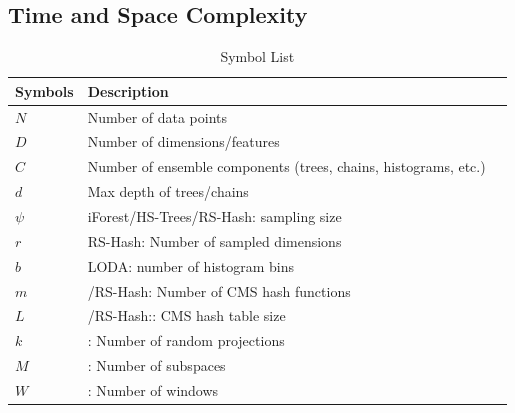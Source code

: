 \subsection{Time and Space Complexity}
%
%

\begin{table}[ht!]
	\caption{Symbol List}
	\centering
	\begin{tabular}{lll}
		\toprule
		\textbf{Symbols} & \textbf{Description}	\\	\hline
		$N$ & Number of data points	\\	\hline
		$D$ & Number of dimensions/features	\\	\hline
		$C$ & Number of ensemble components (trees, chains, histograms, etc.)	\\	\hline
		$d$ & Max depth of trees/chains	\\	\hline
		$\psi$ & iForest/HS-Trees/RS-Hash: sampling size	\\	\hline
		$r$ & RS-Hash: Number of sampled dimensions	\\
		$b$ & LODA: number of histogram bins	\\	\hline
		$m$ & \method/RS-Hash: Number of CMS hash functions	\\
		$L$ & \method/RS-Hash:: CMS hash table size	\\	\hline
		$k$ & \method: Number of random projections	\\
		$M$ & \method: Number of subspaces	\\
		$W$ & \method: Number of windows	\\
		\bottomrule
	\end{tabular}

\end{table}

